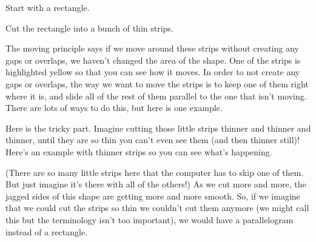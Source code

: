 \documentclass{ximera}
\begin{document}
\begin{example}
Start with a rectangle.
\begin{center}
\end{center}
Cut the rectangle into a bunch of thin strips.
\begin{center}
\end{center}
The moving principle says if we move around these strips without creating any gaps or overlaps, we haven't changed the area of the shape. One of the strips is highlighted yellow so that you can see how it moves. In order to not create any gaps or overlaps, the way we want to move the strips is to keep one of them right where it is, and slide all of the rest of them parallel to the one that isn't moving. There are lots of ways to do this, but here is one example.
\begin{center}
\end{center}
Here is the tricky part. Imagine cutting those little strips thinner and thinner and thinner, until they are so thin you can't even see them (and then thinner still)! Here's an example with thinner strips so you can see what's happening.
\begin{center}
\end{center}
(There are so many little strips here that the computer has to skip one of them. But just imagine it's there with all of the others!) As we cut more and more, the jagged sides of this shape are getting more and more smooth. So, if we imagine that we could cut the strips so thin we couldn't cut them anymore (we might call this  but the terminology isn't too important), we would have a parallelogram instead of a rectangle.

\end{example}
\end{document}
